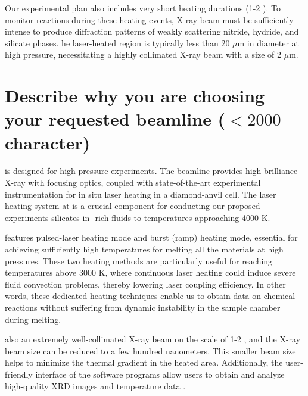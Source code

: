 Our experimental plan also includes very short heating durations (1-2 ). 
To monitor reactions during these  heating events,  X-ray beam must be sufficiently intense to produce  diffraction patterns of weakly scattering nitride, hydride, and silicate phases. 
he laser-heated region is typically less than 20 $\mu$m in diameter at high pressure, necessitating a highly collimated X-ray beam with a size of  2 $\mu$m.

\section{Describe why you are choosing your requested beamline ($<2000$ character)}

  is designed  for high-pressure experiments. 
The beamline provides high-brilliance X-ray with focusing optics, coupled with state-of-the-art experimental instrumentation for in situ laser heating in a diamond-anvil cell. 
The laser heating system at  is a crucial component for conducting our proposed experiments\deleted{,}  silicates  in -rich fluids to temperatures approaching 4000 K.

 features  pulsed-laser heating mode and burst (ramp) heating mode, essential for achieving sufficiently high temperatures for melting all the materials  at high pressures. 
These two heating methods are particularly useful for reaching temperatures above 3000 K, where continuous laser heating could induce severe fluid convection problems, thereby lowering laser coupling efficiency. 
In other words, these dedicated heating techniques enable us to obtain data on chemical reactions without suffering from dynamic instability in the sample chamber during  melting.

 also  an extremely well-collimated X-ray beam on the scale of 1-2 , and the X-ray beam size can  be  reduced to a few hundred nanometers. 
This smaller beam size helps to minimize the  thermal gradient in the heated area. 
Additionally, the user-friendly interface of the software programs allow users to obtain and analyze high-quality XRD images and temperature data .




